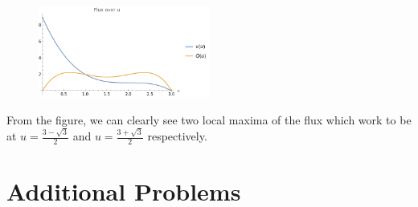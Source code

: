 \documentclass[a4paper,12pt]{article}
\begin{document}
\begin{enumerate}[label = \textbf{(\alph*)}]
        \begin{figure}[h!]
            \centering
            \includegraphics[width = 0.5\textwidth]{images/two_humps.png}
        \end{figure}
    
        From the figure, we can clearly see two local maxima of the flux which work to be at $ u = \frac{3 - \sqrt{3}}{2} $ and $ u = \frac{3 + \sqrt{3}}{2} $ respectively.
	\end{enumerate}

\section*{Additional Problems}
\end{document}

